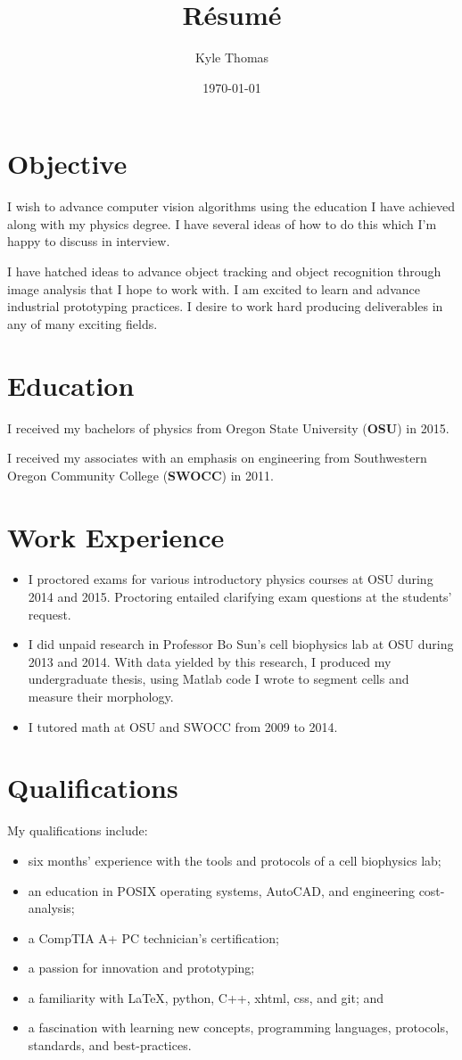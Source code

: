 \documentclass[ notitlepage, prl]{ revtex4-1}
\begin{document}
\author{Kyle Thomas}
\title{R\'esum\'e}
\date{\today}
\maketitle
\section*{Objective}
I wish to advance computer vision algorithms using the education I have achieved along with my physics degree. I have several ideas of how to do this which I'm happy to discuss in interview.

I have hatched ideas to advance object tracking and object recognition through image analysis that I hope to work with. I am excited to learn and advance industrial prototyping practices. I desire to work hard producing deliverables in any of many exciting fields.
\section*{Education}
\par I received my bachelors of physics from Oregon State University (\textbf {OSU}) in 2015.
\par I received my associates with an emphasis on engineering from Southwestern Oregon Community College (\textbf {SWOCC}) in 2011.
\section*{Work Experience}
\begin{itemize}
\item I proctored exams for various introductory physics courses at OSU during 2014 and 2015. Proctoring entailed clarifying exam questions at the students' request.
\item I did unpaid research in Professor Bo Sun's cell biophysics lab at OSU during 2013 and 2014. With data yielded by this research, I produced my undergraduate thesis, using Matlab code I wrote to segment cells and measure their morphology.
\item I tutored math at OSU and SWOCC from 2009 to 2014.
\end{itemize}

\section*{Qualifications}
My qualifications include:
\begin{itemize}
\item six months' experience with the tools and protocols of a cell biophysics lab;
\item an education in POSIX operating systems, AutoCAD, and engineering cost-analysis;
\item a CompTIA A+ PC technician's certification;
\item a passion for innovation and prototyping;
\item a familiarity with \LaTeX, python, C++, xhtml, css, and git; and
\item a fascination with learning new concepts, programming languages, protocols, standards, and best-practices.
\end{itemize}
\end{document}
